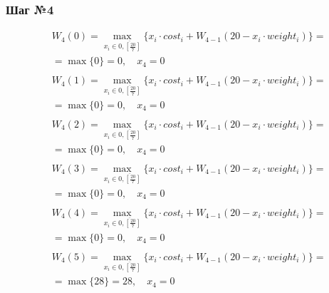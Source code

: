 \documentclass[17pt]{extarticle}
\begin{document}
\subsubsection*{Шаг №4}
\[
    \begin{aligned}
         & W_4(0)=\max_{x_i \in \overline{0, \left[\frac{20}{7}\right]}} \{x_i \cdot cost_i + W_{4-1}(20 - x_i \cdot weight_i)\}= \\& = \max \{
        0\}= 0, \quad x_4 = 0                                                                                                     \\
    \end{aligned}
\]
\[
    \begin{aligned}
         & W_4(1)=\max_{x_i \in \overline{0, \left[\frac{20}{7}\right]}} \{x_i \cdot cost_i + W_{4-1}(20 - x_i \cdot weight_i)\}= \\& = \max \{
        0\}= 0, \quad x_4 = 0                                                                                                     \\
    \end{aligned}
\]
\[
    \begin{aligned}
         & W_4(2)=\max_{x_i \in \overline{0, \left[\frac{20}{7}\right]}} \{x_i \cdot cost_i + W_{4-1}(20 - x_i \cdot weight_i)\}= \\& = \max \{
        0\}= 0, \quad x_4 = 0                                                                                                     \\
    \end{aligned}
\]
\[
    \begin{aligned}
         & W_4(3)=\max_{x_i \in \overline{0, \left[\frac{20}{7}\right]}} \{x_i \cdot cost_i + W_{4-1}(20 - x_i \cdot weight_i)\}= \\& = \max \{
        0\}= 0, \quad x_4 = 0                                                                                                     \\
    \end{aligned}
\]
\[
    \begin{aligned}
         & W_4(4)=\max_{x_i \in \overline{0, \left[\frac{20}{7}\right]}} \{x_i \cdot cost_i + W_{4-1}(20 - x_i \cdot weight_i)\}= \\& = \max \{
        0\}= 0, \quad x_4 = 0                                                                                                     \\
    \end{aligned}
\]
\[
    \begin{aligned}
         & W_4(5)=\max_{x_i \in \overline{0, \left[\frac{20}{7}\right]}} \{x_i \cdot cost_i + W_{4-1}(20 - x_i \cdot weight_i)\}= \\& = \max \{
        28\}= 28, \quad x_4 = 0                                                                                                   \\
    \end{aligned}
\]
\end{document}
